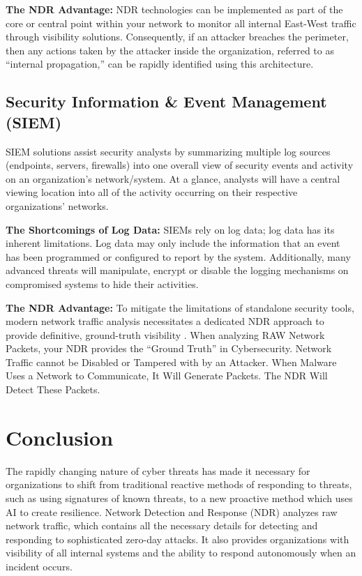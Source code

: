 \documentclass[12pt,a4paper]{report}
\begin{document}
\textbf{The NDR Advantage:} NDR technologies can be implemented as part of the core or central point within your network to monitor all internal East-West traffic through visibility solutions. Consequently, if an attacker breaches the perimeter, then any actions taken by the attacker inside the organization, referred to as ``internal propagation,'' can be rapidly identified using this architecture.

\subsection{Security Information \& Event Management (SIEM)} 

SIEM solutions assist security analysts by summarizing multiple log sources (endpoints, servers, firewalls) into one overall view of security events and activity on an organization's network/system. At a glance, analysts will have a central viewing location into all of the activity occurring on their respective organizations' networks.

\textbf{The Shortcomings of Log Data:} SIEMs rely on log data; log data has its inherent limitations. Log data may only include the information that an event has been programmed or configured to report by the system. Additionally, many advanced threats will manipulate, encrypt or disable the logging mechanisms on compromised systems to hide their activities.

\textbf{The NDR Advantage:} To mitigate the limitations of standalone security tools, modern network traffic analysis necessitates a dedicated NDR approach to provide definitive, ground-truth visibility \cite{ivanova2025}. When analyzing RAW Network Packets, your NDR provides the ``Ground Truth'' in Cybersecurity. Network Traffic cannot be Disabled or Tampered with by an Attacker. When Malware Uses a Network to Communicate, It Will Generate Packets. The NDR Will Detect These Packets.

\section{Conclusion}

The rapidly changing nature of cyber threats has made it necessary for organizations to shift from traditional reactive methods of responding to threats, such as using signatures of known threats, to a new proactive method which uses AI to create resilience. Network Detection and Response (NDR) analyzes raw network traffic, which contains all the necessary details for detecting and responding to sophisticated zero-day attacks. It also provides organizations with visibility of all internal systems and the ability to respond autonomously when an incident occurs.
\end{document}
